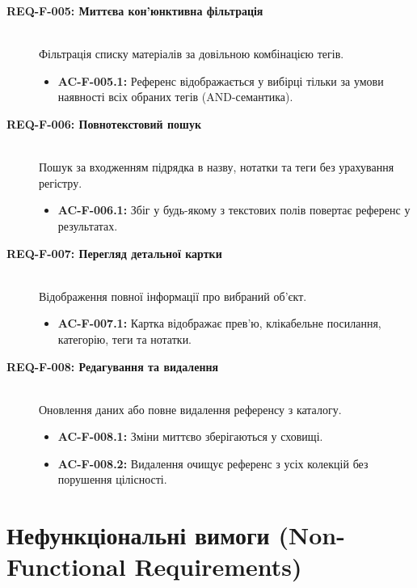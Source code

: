 \documentclass[12pt,a4paper]{article}
\begin{document}
\begin{description}
    \item[\textbf{REQ-F-005: Миттєва кон'юнктивна фільтрація}] \hfill \\
    Фільтрація списку матеріалів за довільною комбінацією тегів.
    \begin{itemize}[noitemsep]
        \item \textbf{AC-F-005.1:} Референс відображається у вибірці тільки за умови наявності всіх обраних тегів (AND-семантика).
    \end{itemize}

    \item[\textbf{REQ-F-006: Повнотекстовий пошук}] \hfill \\
    Пошук за входженням підрядка в назву, нотатки та теги без урахування регістру.
    \begin{itemize}[noitemsep]
        \item \textbf{AC-F-006.1:} Збіг у будь-якому з текстових полів повертає референс у результатах.
    \end{itemize}

    \item[\textbf{REQ-F-007: Перегляд детальної картки}] \hfill \\
    Відображення повної інформації про вибраний об'єкт.
    \begin{itemize}[noitemsep]
        \item \textbf{AC-F-007.1:} Картка відображає прев'ю, клікабельне посилання, категорію, теги та нотатки.
    \end{itemize}

    \item[\textbf{REQ-F-008: Редагування та видалення}] \hfill \\
    Оновлення даних або повне видалення референсу з каталогу.
    \begin{itemize}[noitemsep]
        \item \textbf{AC-F-008.1:} Зміни миттєво зберігаються у сховищі.
        \item \textbf{AC-F-008.2:} Видалення очищує референс з усіх колекцій без порушення цілісності.
    \end{itemize}
\end{description}

\section{Нефункціональні вимоги (Non-Functional Requirements)}
\end{document}
